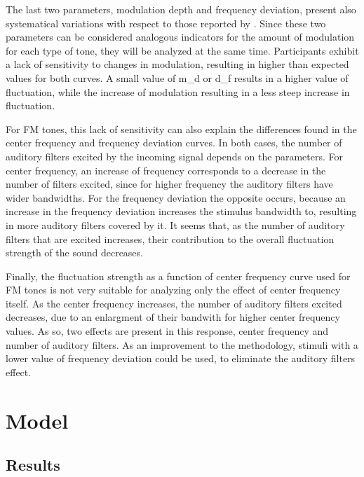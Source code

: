 \documentclass[../main.tex]{subfiles}
\begin{document}
The last two parameters, modulation depth and frequency deviation, present also
systematical variations with respect to those reported by
\citeauthor{Fastl2007Psychoacoustics}. Since these two parameters can be
considered analogous indicators for the amount of modulation for each type of
tone, they will be analyzed at the same time. Participants exhibit a lack of
sensitivity to changes in modulation, resulting in higher than expected values
for both curves. A small value of \gls{m_d} or \gls{d_f} results in a higher
value of fluctuation, while the increase of modulation resulting in a less
steep increase in fluctuation.

For \gls{FM} tones, this lack of sensitivity can also explain the differences
found in the center frequency and frequency deviation curves. In both cases,
the number of auditory filters excited by the incoming signal depends on
the parameters. For center frequency, an increase of frequency corresponds to a
decrease in the number of filters excited, since for higher frequency the
auditory filters have wider bandwidths. For the frequency deviation the opposite
occurs, because an increase in the frequency deviation increases the
stimulus bandwidth to, resulting in more auditory filters covered by it. It
seems that, as the number of auditory filters that are excited increases, their
contribution to the overall fluctuation strength of the sound decreases.

Finally, the fluctuation strength as a function of center frequency curve used
for \gls{FM} tones is not very suitable for analyzing only the effect of center
frequency itself. As the center frequency increases, the number of auditory
filters excited decreases, due to an enlargment of their bandwith for higher
center frequency values. As so, two effects are present in this response, center
frequency and number of auditory filters. As an improvement to the methodology,
stimuli with a lower value of frequency deviation could be used, to eliminate
the auditory filters effect.

\section{Model}

\subsection{Results}
\end{document}
